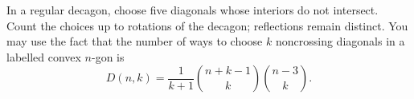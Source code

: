 In a regular decagon, choose five diagonals whose interiors do not intersect. Count the choices up to rotations of the decagon; reflections remain distinct. You may use the fact that the number of ways to choose $k$ noncrossing diagonals in a labelled convex $n$-gon is
\[D(n,k)=\dfrac{1}{k+1}\binom{n+k-1}{k}\binom{n-3}{k}.\]
